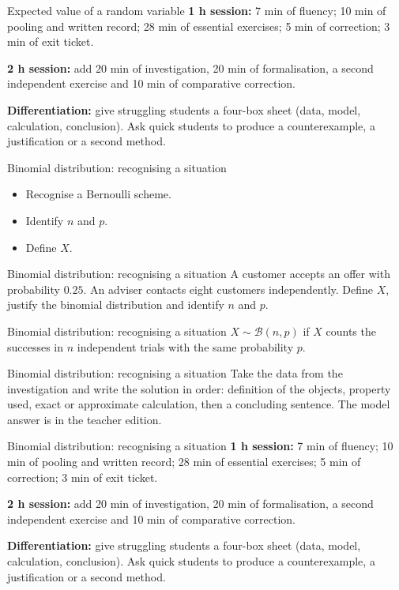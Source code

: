 \documentclass[aspectratio=169,10pt]{beamer}
\begin{document}
\begin{frame}{Expected value of a random variable}
\textbf{1 h session:} 7 min of fluency; 10 min of pooling and written record; 28 min of essential exercises; 5 min of correction; 3 min of exit ticket.

\textbf{2 h session:} add 20 min of investigation, 20 min of formalisation, a second independent exercise and 10 min of comparative correction.

\textbf{Differentiation:} give struggling students a four-box sheet (data, model, calculation, conclusion). Ask quick students to produce a counterexample, a justification or a second method.
\end{frame}
\begin{frame}{Binomial distribution: recognising a situation}
\begin{itemize}
\item Recognise a Bernoulli scheme.
\item Identify \(n\) and \(p\).
\item Define \(X\).

\end{itemize}
\end{frame}
\begin{frame}{Binomial distribution: recognising a situation}
A customer accepts an offer with probability \(0.25\). An adviser contacts eight customers independently. Define \(X\), justify the binomial distribution and identify \(n\) and \(p\).
\end{frame}
\begin{frame}{Binomial distribution: recognising a situation}
\(X\sim\mathcal B(n,p)\) if \(X\) counts the successes in \(n\) independent trials with the same probability \(p\).
\end{frame}
\begin{frame}{Binomial distribution: recognising a situation}
Take the data from the investigation and write the solution in order: definition of the objects, property used, exact or approximate calculation, then a concluding sentence. The model answer is in the teacher edition.
\end{frame}
\begin{frame}{Binomial distribution: recognising a situation}
\textbf{1 h session:} 7 min of fluency; 10 min of pooling and written record; 28 min of essential exercises; 5 min of correction; 3 min of exit ticket.

\textbf{2 h session:} add 20 min of investigation, 20 min of formalisation, a second independent exercise and 10 min of comparative correction.

\textbf{Differentiation:} give struggling students a four-box sheet (data, model, calculation, conclusion). Ask quick students to produce a counterexample, a justification or a second method.
\end{frame}
\end{document}
